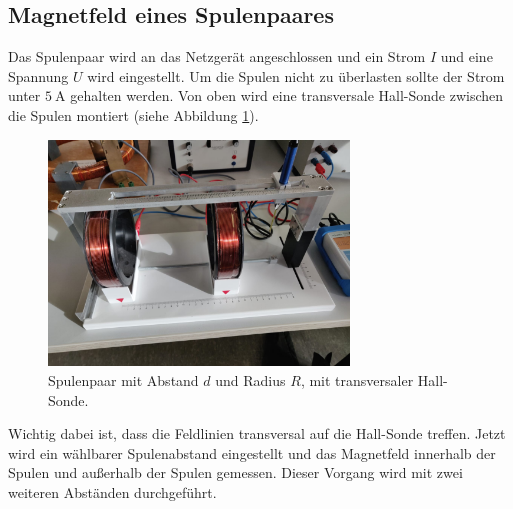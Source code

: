 \subsection{Magnetfeld eines Spulenpaares}
Das Spulenpaar wird an das Netzgerät angeschlossen und ein Strom $I$ und eine Spannung $U$ wird eingestellt.
Um die Spulen nicht zu überlasten sollte der Strom unter $\SI{5}{\ampere}$ gehalten werden.
Von oben wird eine transversale Hall-Sonde zwischen die Spulen montiert (siehe Abbildung \ref{fig:spulenpaar}).
\begin{figure}
    \centering
    \includegraphics[height=6cm]{content/spulenpaar.jpg}
    \caption{Spulenpaar mit Abstand $d$ und Radius $R$, mit transversaler Hall-Sonde.}
    \label{fig:spulenpaar}
\end{figure}
\FloatBarrier
Wichtig dabei ist, dass die Feldlinien transversal auf die Hall-Sonde treffen.
Jetzt wird ein wählbarer Spulenabstand eingestellt und das Magnetfeld innerhalb der Spulen und außerhalb der Spulen gemessen.
Dieser Vorgang wird mit zwei weiteren Abständen durchgeführt.

